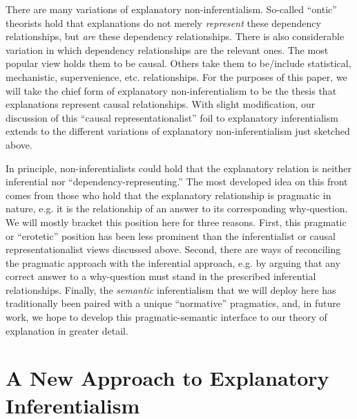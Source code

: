 \documentclass{svjour3}                     %
\begin{document}
There are many variations of explanatory non-inferentialism. So-called ``ontic'' theorists hold that explanations do not merely \textit{represent} these dependency relationships, but \textit{are} these dependency relationships. There is also considerable variation in which dependency relationships are the relevant ones. The most popular view holds them to be causal. Others take them to be/include statistical, mechanistic, supervenience, etc. relationships. For the purposes of this paper, we will take the chief form of explanatory non-inferentialism to be the thesis that explanations represent causal relationships. With slight modification, our discussion of this ``causal representationalist'' foil to explanatory inferentialism extends to the different variations of explanatory non-inferentialism just sketched above. 

In principle, non-inferentialists could hold that the explanatory relation is neither inferential nor ``dependency-representing.'' The most developed idea on this front comes from those who hold that the explanatory relationship is pragmatic in nature, e.g. it is the relationship of an answer to its corresponding why-question. We will mostly bracket this position here for three reasons. First, this pragmatic or ``erotetic'' position has been less prominent than the inferentialist or causal representationalist views discussed above. Second, there are ways of reconciling the pragmatic approach with the inferential approach, e.g. by arguing that any correct answer to a why-question must stand in the prescribed inferential relationships. Finally, the \textit{semantic} inferentialism that we will deploy here has traditionally been paired with a unique ``normative'' pragmatics, and, in future work, we hope to develop this pragmatic-semantic interface to our theory of explanation in greater detail.

\section{A New Approach to Explanatory Inferentialism}
\label{kernel}
\end{document}

